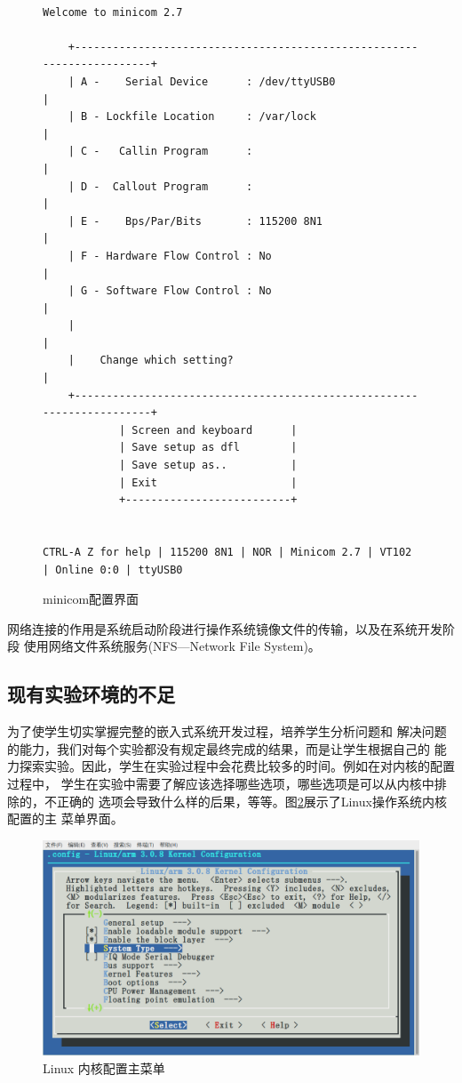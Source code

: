 \documentclass[nofonts]{ctexart}
\begin{document}
\begin{figure}
\centering
\fontsize{9}{8}\selectfont
\begin{verbatim}

Welcome to minicom 2.7

    +-----------------------------------------------------------------------+
    | A -    Serial Device      : /dev/ttyUSB0                              |
    | B - Lockfile Location     : /var/lock                                 |
    | C -   Callin Program      :                                           |
    | D -  Callout Program      :                                           |
    | E -    Bps/Par/Bits       : 115200 8N1                                |
    | F - Hardware Flow Control : No                                        |
    | G - Software Flow Control : No                                        |
    |                                                                       |
    |    Change which setting?                                              |
    +-----------------------------------------------------------------------+
            | Screen and keyboard      |
            | Save setup as dfl        |
            | Save setup as..          |
            | Exit                     |
            +--------------------------+


CTRL-A Z for help | 115200 8N1 | NOR | Minicom 2.7 | VT102 | Online 0:0 | ttyUSB0              
\end{verbatim}
\caption{minicom配置界面}\label{fig2}
\end{figure}

网络连接的作用是系统启动阶段进行操作系统镜像文件的传输，以及在系统开发阶段
使用网络文件系统服务(NFS---Network File System)。

\subsection{现有实验环境的不足}
为了使学生切实掌握完整的嵌入式系统开发过程，培养学生分析问题和
解决问题的能力，我们对每个实验都没有规定最终完成的结果，而是让学生根据自己的
能力探索实验。因此，学生在实验过程中会花费比较多的时间。例如在对内核的配置
过程中，
学生在实验中需要了解应该选择哪些选项，哪些选项是可以从内核中排除的，不正确的
选项会导致什么样的后果，等等。图\ref{fig3}展示了Linux操作系统内核配置的主
菜单界面。

\begin{figure}
\centering
\includegraphics[width=.8\textwidth]{menu0}
\caption{Linux 内核配置主菜单}\label{fig3}
\end{figure}
\end{document}

